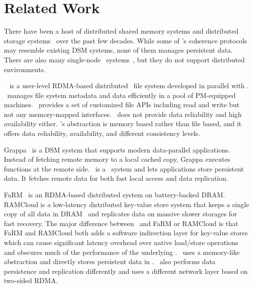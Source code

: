 \section{Related Work}
\label{sec:hotpot:related}

There have been a host of distributed shared memory systems and
distributed storage
systems~\cite{AdyaEtAl-Farsite,calder11-azure,DeCandia+07-Dynamo,Ghemawat03-GoogleFS,KubiEtAl00-Ocean,Petersen97-Bayou,Terry13-Pileus,Chun06-NSDI,Gibbons91-SPAA,Krieger90-HICSS,Zhang15-SOSP,Zhou92-IEEE,Stumm90-IEEE,Stumm90-IPDPS,HLRC,Shasta}
over the past few decades.
While some of \hotpot's coherence protocols may resemble existing DSM systems, none of them manages persistent data.
There are also many single-node \nvm\ systems~\cite{MemoryPersistency,pmxact-asplos16,Delegated-persist,sosp09:bpfs,Dragojevic14-NSDI,Dulloor14-EuroSys,Xiaojian11-SC,HiNFS-Eurosys16,Kamino-EuroSys17,Coburn11-ASPLOS,Volos11-ASPLOS},
but they do not support distributed environments.

\Octopus~\cite{Octopus} is a user-level RDMA-based distributed \nvm\ file system developed in parallel with \hotpot.
\Octopus\ manages file system metadata and data efficiently in a pool of PM-equipped machines. 
\Octopus\ provides a set of customized file APIs including read and write
but not any memory-mapped interfaces.
\Octopus\ does not provide data reliability and high availability either.
\hotpot's abstraction is memory based rather than file based,
and it offers data reliability, availability, and different consistency levels.

Grappa~\cite{Nelson15-ATC} is a DSM system that supports modern data-parallel applications.
Instead of fetching remote memory to a local cached copy, Grappa executes functions at the remote side.
\hotpot\ is a \dsnvm\ system and lets applications store persistent data.
It fetches remote data for both fast local access and data replication.

FaRM~\cite{Kalia14-SIGCOMM,Dragojevic14-NSDI} is an RDMA-based
distributed system on battery-backed DRAM.
RAMCloud is a low-latency distributed key-value store system that keeps a single copy of all data in DRAM~\cite{Ongaro11-RamCloud}
and replicates data on massive slower storages for fast recovery.
The major difference between \hotpot\ and FaRM or RAMCloud is that
FaRM and RAMCloud both adds a software indirection layer for key-value stores
which can cause significant latency overhead over native load/store operations
and obscures much of the performance of the underlying \nvm.
\hotpot\ uses a memory-like abstraction and directly stores persistent data in \nvm.
\hotpot\ also performs data persistence and replication differently
and uses a different network layer based on two-sided RDMA.

